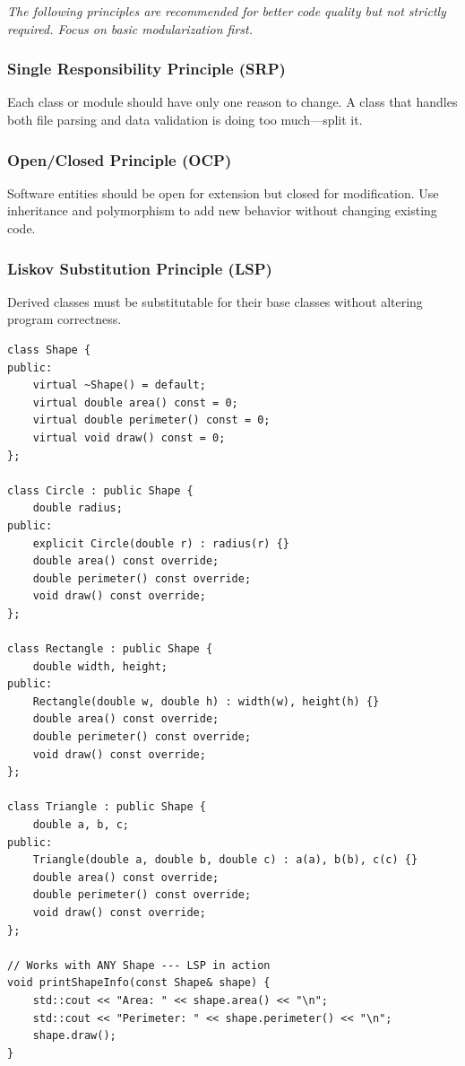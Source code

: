 \textit{The following principles are recommended for better code quality but not strictly required. Focus on basic modularization first.}

\subsubsection{Single Responsibility Principle (SRP)}

Each class or module should have only one reason to change. A class that handles both file parsing and data validation is doing too much---split it.

\subsubsection{Open/Closed Principle (OCP)}

Software entities should be open for extension but closed for modification. Use inheritance and polymorphism to add new behavior without changing existing code.

\subsubsection{Liskov Substitution Principle (LSP)}

Derived classes must be substitutable for their base classes without altering program correctness.

\begin{lstlisting}[style=cpp]
class Shape {
public:
    virtual ~Shape() = default;
    virtual double area() const = 0;
    virtual double perimeter() const = 0;
    virtual void draw() const = 0;
};

class Circle : public Shape {
    double radius;
public:
    explicit Circle(double r) : radius(r) {}
    double area() const override;
    double perimeter() const override;
    void draw() const override;
};

class Rectangle : public Shape {
    double width, height;
public:
    Rectangle(double w, double h) : width(w), height(h) {}
    double area() const override;
    double perimeter() const override;
    void draw() const override;
};

class Triangle : public Shape {
    double a, b, c;
public:
    Triangle(double a, double b, double c) : a(a), b(b), c(c) {}
    double area() const override;
    double perimeter() const override;
    void draw() const override;
};

// Works with ANY Shape --- LSP in action
void printShapeInfo(const Shape& shape) {
    std::cout << "Area: " << shape.area() << "\n";
    std::cout << "Perimeter: " << shape.perimeter() << "\n";
    shape.draw();
}
\end{lstlisting}

